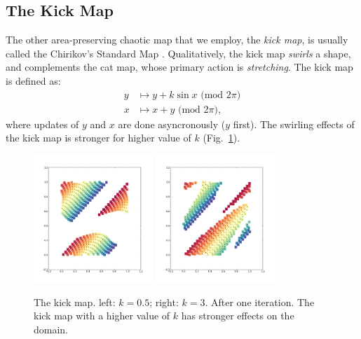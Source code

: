 \documentclass[12pt]{reedmcm}
\begin{document}
\subsection{The Kick Map}
The other area-preserving chaotic map that we employ, the \textit{kick map}, is usually called the Chirikov's Standard Map \citep{ott}.
Qualitatively, the kick map \textit{swirls} a shape, and complements the cat map, whose primary action is \textit{stretching}.
The kick map is defined as:
\begin{align*}
  y &\mapsto y + k \sin x \mbox{ (mod $2\pi$)} \\
  x &\mapsto x + y \mbox{ (mod $2\pi$)},
\end{align*}
where updates of $y$ and $x$ are done asyncronously ($y$ first).
The swirling effects of the kick map is stronger for higher value of $k$ (Fig.~\ref{fig:kickmap_demo1}).
%
\begin{figure}[h!]
  \centering
  \includegraphics[width=0.4\textwidth]{kickmap_05}
  \hspace{2cm}
  \includegraphics[width=0.4\textwidth]{kickmap_3}
  \caption{The kick map. left: $k=0.5$; right: $k = 3$. After one iteration. 
    The kick map with a higher value of $k$ has stronger effects on the domain.
  }
  \label{fig:kickmap_demo1}
\end{figure}
%
\end{document}
